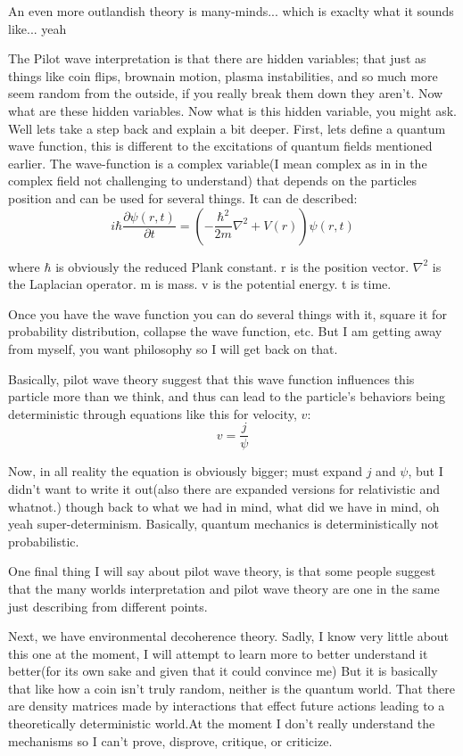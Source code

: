 \par An even more outlandish theory is many-minds... which is exaclty what it sounds like... yeah
\par The Pilot wave interpretation is that there are hidden variables; that just as things like coin flips, brownain motion, plasma instabilities, and so much more seem random from the outside, if you really break them down they aren't. Now what are these hidden variables. Now what is this hidden variable, you might ask. Well lets take a step back and explain a bit deeper. First, lets define a quantum wave function, this is different to the excitations of quantum fields mentioned earlier. The wave-function is a complex variable(I mean complex as in in the complex field not challenging to understand) that depends on the particles position and can be used for several things. It can de described:
$$
i \hbar \frac{\partial \psi(r,t)}{\partial t}=(-\frac{\hbar ^2}{2m}\nabla ^2 +V(r))\psi (r,t)
$$
\par where $\hbar$ is obviously the reduced Plank constant. r is the position vector. $\nabla ^2$ is the Laplacian operator. m is mass. v is the potential energy. t is time.
\par Once you have the wave function you can do several things with it, square it for probability distribution, collapse the wave function, etc. But I am getting away from myself, you want philosophy so I will get back on that.
\par Basically, pilot wave theory suggest that this wave function influences this particle more than we think, and thus can lead to the particle's behaviors being deterministic through equations like this for velocity, $v$:
$$
v=\frac{j}{\psi}
$$
\par Now, in all reality the equation is obviously bigger; must expand $j$ and $\psi$, but I didn't want to write it out(also there are expanded versions for relativistic and whatnot.) though back to what we had in mind, what did we have in mind, oh yeah super-determinism. Basically, quantum mechanics is deterministically not probabilistic.
\par One final thing I will say about pilot wave theory, is that some people suggest that the many worlds interpretation and pilot wave theory are one in the same just describing from different points.
\par Next, we have environmental decoherence theory. Sadly, I know very little about this one at the moment, I will attempt to learn more to better understand it better(for its own sake and given that it could convince me) But it is basically that like how a coin isn't truly random, neither is the quantum world. That there are density matrices made by interactions that effect future actions leading to a theoretically deterministic world.At the moment I don't really understand the mechanisms so I can't prove, disprove, critique, or criticize.
